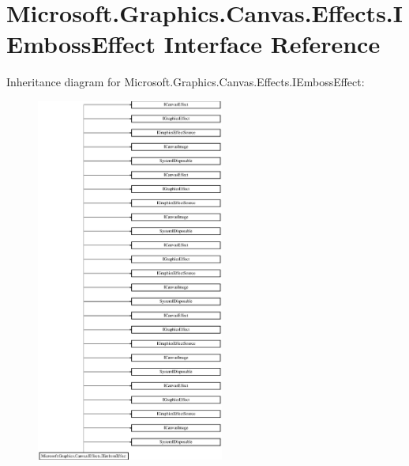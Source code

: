 \hypertarget{interface_microsoft_1_1_graphics_1_1_canvas_1_1_effects_1_1_i_emboss_effect}{}\section{Microsoft.\+Graphics.\+Canvas.\+Effects.\+I\+Emboss\+Effect Interface Reference}
\label{interface_microsoft_1_1_graphics_1_1_canvas_1_1_effects_1_1_i_emboss_effect}
Inheritance diagram for Microsoft.\+Graphics.\+Canvas.\+Effects.\+I\+Emboss\+Effect\+:\begin{figure}[H]
\begin{center}
\leavevmode
\includegraphics[height=12.000000cm]{interface_microsoft_1_1_graphics_1_1_canvas_1_1_effects_1_1_i_emboss_effect}
\end{center}
\end{figure}
